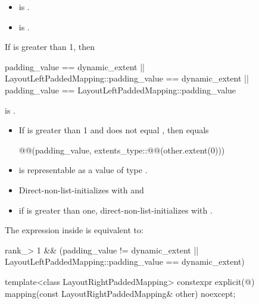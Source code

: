\begin{itemdescr}
\pnum
\constraints
\begin{itemize}
\item
{}
is .
\item
{}
\newline is .
\end{itemize}

\pnum
\mandates
If  is greater than 1,
then
\begin{codeblock}
padding_value == dynamic_extent ||
LayoutLeftPaddedMapping::padding_value == dynamic_extent ||
padding_value == LayoutLeftPaddedMapping::padding_value
\end{codeblock}
is .

\pnum
\expects
\begin{itemize}
\item
If  is greater than 1 and
 does not equal ,
then  equals
\begin{codeblock}
@@(padding_value,
                        extents_type::@@(other.extent(0)))
\end{codeblock}
\item
{} is representable as
a value of type .
\end{itemize}

\pnum
\effects
\begin{itemize}
\item
Direct-non-list-initializes  with  and
\item
if  is greater than one,
direct-non-list-initializes  with .
\end{itemize}

\pnum
\remarks
The expression inside  is equivalent to:
\begin{codeblock}
rank_> 1 &&
(padding_value != dynamic_extent ||
 LayoutLeftPaddedMapping::padding_value == dynamic_extent)
\end{codeblock}
\end{itemdescr}

%
\begin{itemdecl}
template<class LayoutRightPaddedMapping>
  constexpr explicit(@\seebelow@)
    mapping(const LayoutRightPaddedMapping& other) noexcept;
\end{itemdecl}

